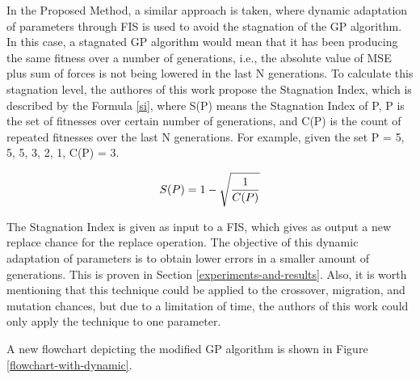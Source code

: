 In the Proposed Method, a similar approach is taken, where dynamic adaptation of parameters through FIS is used to avoid the stagnation of the GP algorithm. In this case, a stagnated GP algorithm would mean that it has been producing the same fitness over a number of generations, i.e., the absolute value of MSE plus sum of forces is not being lowered in the last N generations. To calculate this stagnation level, the authores of this work propose the Stagnation Index, which is described by the Formula \ref{si}, where S(P) means the Stagnation Index of P, P is the set of fitnesses over certain number of generations, and C(P) is the count of repeated fitnesses over the last N generations. For example, given the set P = {5, 5, 5, 3, 2, 1}, C(P) = 3.

\begin{equation} \label{si}
S(P) = 1 - \sqrt{1 \over C(P)}
\end{equation}

The Stagnation Index is given as input to a FIS, which gives as output a new replace chance for the replace operation. The objective of this dynamic adaptation of parameters is to obtain lower errors in a smaller amount of generations. This is proven in Section \ref{experiments-and-results}. Also, it is worth mentioning that this technique could be applied to the crossover, migration, and mutation chances, but due to a limitation of time, the authors of this work could only apply the technique to one parameter.

A new flowchart depicting the modified GP algorithm is shown in Figure \ref{flowchart-with-dynamic}.


  
  
  
  
  
  
  
  
  
  
  
  
  
  
  
  
  
  
  
  
  
  
  